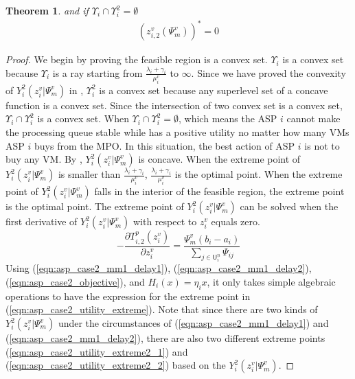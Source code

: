 \documentclass[10pt,journal, compsoc]{IEEEtran}
\newtheorem{theorem}{Theorem}
\begin{document}
\begin{theorem}
and if $\Upsilon_i \cap \Upsilon_i^2 = \emptyset$
\begin{equation}\label{eqn:asp_case2_optimal_solution_individual_rationality}
\begin{aligned}
    (z_{i,2}^{v}(\Psi_m^v))^*=0
\end{aligned}
\end{equation}

\end{theorem}
\begin{proof}
We begin by proving the feasible region is a convex set. $\Upsilon_i$ is a convex set because $\Upsilon_i$ is a ray starting from $\frac{\lambda_i+\gamma_i}{\mu_i^v}$ to $\infty$. Since we have proved the convexity of $Y_i^2(z_i^v|\Psi_m^v)$ in , $\Upsilon_i^2$ is a convex set because any superlevel set of a concave function is a convex set. Since the intersection of two convex set is a convex set, $\Upsilon_i \cap \Upsilon_i^2$ is a convex set. When $\Upsilon_i \cap \Upsilon_i^2 = \emptyset$, which means the ASP $i$ cannot make the processing queue stable while has a positive utility no matter how many VMs ASP $i$ buys from the MPO. In this situation, the best action of ASP $i$ is not to buy any VM. By , $Y_i^2(z_i^v|\Psi_m^v)$ is concave. When the extreme point of $Y_i^2(z_i^v|\Psi_m^v)$ is smaller than $\frac{\lambda_i+\gamma_i}{\mu_i^v}$, $\frac{\lambda_i+\gamma_i}{\mu_i^v}$ is the optimal point. When the extreme point of $Y_i^2(z_i^v|\Psi_m^v)$ falls in the interior of the feasible region, the extreme point is the optimal point. The extreme point of $Y_i^2(z_i^v|\Psi_m^v)$ can be solved when the first derivative of $Y_i^2(z_i^v|\Psi_m^v)$ with respect to $z_i^v$ equals zero.
\begin{equation} \label{eqn:asp_case2_utility_first_deriv}
-\frac{\partial T_{i,2}^p(z_i^v)}{\partial z_i^v} = \frac{\Psi_m^v (b_i - a_i)}{\sum_{j \in \mathsf{U}_i^n} \Psi_{ij}}
\end{equation}
Using (\ref{eqn:asp_case2_mm1_delay1}), (\ref{eqn:asp_case2_mm1_delay2}), (\ref{eqn:asp_case2_objective}), and $H_i(x)=\eta_i x$, it only takes simple algebraic operations to have the expression for the extreme point in (\ref{eqn:asp_case2_utility_extreme}). Note that since there are two kinds of $Y_i^2(z_i^v|\Psi_m^v)$ under the circumstances of (\ref{eqn:asp_case2_mm1_delay1}) and (\ref{eqn:asp_case2_mm1_delay2}), there are also two different extreme points (\ref{eqn:asp_case2_utility_extreme2_1}) and (\ref{eqn:asp_case2_utility_extreme2_2}) based on the $Y_i^2(z_i^v|\Psi_m^v)$.\qedhere
\end{proof}
\end{document}
